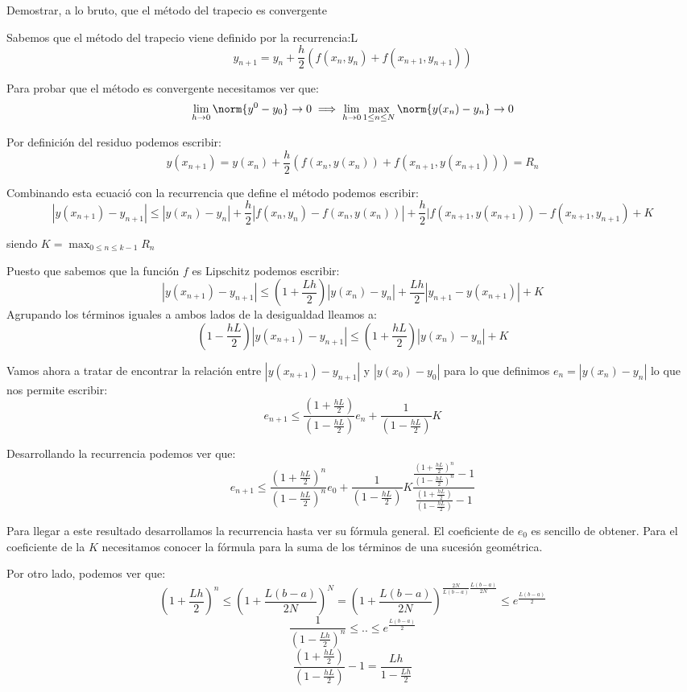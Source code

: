 \begin{problem}[2]
Demostrar, a lo bruto, que el método del trapecio es convergente

\solution

Sabemos que el método del trapecio viene definido por la recurrencia:L
\[y_{n+1} = y_n +\frac{h}{2}\left(f(x_n,y_n)+f(x_{n+1},y_{n+1}) \right)\]

Para probar que el método es convergente necesitamos ver que:
\[\lim_{h \to 0 } \norm{y^0-y_0} \to 0 \implies \lim_{h\to 0} \max_{1 \leq n \leq N}\norm{y(x_n)-y_n} \to 0\]

Por definición del residuo podemos escribir:
\[y(x_{n+1}) = y(x_n) +\frac{h}{2}\left(f(x_n,y(x_n))+f(x_{n+1},y(x_{n+1})) \right) = R_n\]

Combinando esta ecuació con la recurrencia que define el método podemos escribir:
\[|y(x_{n+1})-y_{n+1}| \leq |y(x_n)-y_n|+\frac{h}{2}|f(x_n,y_n)-f(x_n,y(x_n))|+\frac{h}{2}|f(x_{n+1},y(x_{n+1}))-f(x_{n+1},y_{n+1})+K\]

siendo $K=\max_{0 \leq n \leq k-1} R_n$

Puesto que sabemos que la función $f$ es Lipschitz podemos escribir:
\[|y(x_{n+1})-y_{n+1}| \leq \left( 1 + \frac{Lh}{2}\right)|y(x_n)-y_n|+\frac{Lh}{2}|y_{n+1}-y(x_{n+1})| + K\]
Agrupando los términos iguales a ambos lados de la desigualdad lleamos a:
\[\left(1- \frac{hL}{2}\right)|y(x_{n+1})-y_{n+1}| \leq \left(1+ \frac{hL}{2}\right)|y(x_n)-y_n| + K\]

Vamos ahora a tratar de encontrar la relación entre $|y(x_{n+1})-y_{n+1}|$ y $|y(x_0)-y_0|$ para lo que definimos $e_n=|y(x_{n})-y_{n}|$ lo que nos permite escribir:
\[e_{n+1} \leq \frac{\left(1+ \frac{hL}{2}\right)}{\left(1- \frac{hL}{2}\right)}e_n + \frac{1}{\left(1- \frac{hL}{2}\right)}K\]

Desarrollando la recurrencia podemos ver que:
\[e_{n+1} \leq \frac{\left(1+ \frac{hL}{2}\right)^n}{\left(1- \frac{hL}{2}\right)^n}e_0 + \frac{1}{\left(1- \frac{hL}{2}\right)}K\frac{\frac{\left(1+ \frac{hL}{2}\right)^n}{\left(1- \frac{hL}{2}\right)^n}-1}{\frac{\left(1+ \frac{hL}{2}\right)}{\left(1- \frac{hL}{2}\right)}-1}\]

\obs Para llegar a este resultado desarrollamos la recurrencia hasta ver su fórmula general. El coeficiente de $e_0$ es sencillo de obtener. Para el coeficiente de la $K$ necesitamos conocer la fórmula para la suma de los términos de una sucesión geométrica.

Por otro lado, podemos ver que:
\[\left( 1 + \frac{Lh}{2} \right)^n \leq \left( 1 + \frac{L(b-a)}{2N}\right)^N=\left(1 + \frac{L(b-a)}{2N}\right)^{\frac{2N}{L(b-a)}\frac{L(b-a)}{2N}}\leq e^{\frac{L(b-a)}{2}}\]
\[\frac{1}{\left( 1-\frac{Lh}{2}\right)^n} \leq .. \leq e^{\frac{L(b-a)}{2}}\]
\[\frac{\left(1+ \frac{hL}{2}\right)}{\left(1- \frac{hL}{2}\right)}-1 = \frac{Lh}{1-\frac{Lh}{2}}\]


\end{problem}
